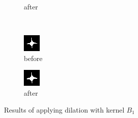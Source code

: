 \documentclass[12pt]{article}
\renewcommand{\subfiguresize}{.25\textwidth}
\begin{document}
\begin{figure}[H]
\begin{subfigure}[t]{\subfiguresize}
        \caption{after}
    \end{subfigure}\\[1em]
    \begin{subfigure}[t]{\subfiguresize}\centering
        \includegraphics[width=\textwidth]{img/image2.png}
        \caption{before}
    \end{subfigure}
    \hspace{2em}
    \begin{subfigure}[t]{\subfiguresize}\centering
        \includegraphics[width=\textwidth]{img/image2-dilation-b2.png}
        \caption{after}
    \end{subfigure}
    \caption{Results of applying dilation with kernel $B_1$}
\end{figure}  
\end{document}
